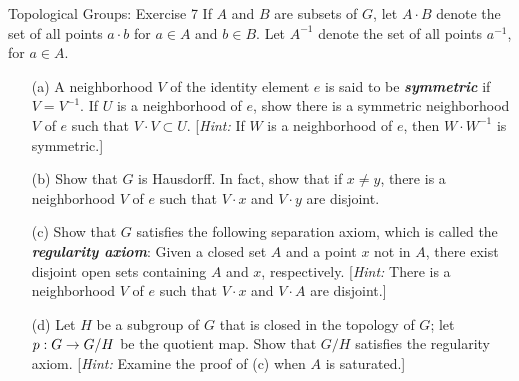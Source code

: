 \documentclass{hmwk}
\begin{document}
\begin{problem}{Topological Groups: Exercise 7}
    If $A$ and $B$ are subsets of $G$, let $A \cdot B$ denote the set of all points $a \cdot b$ for $a \in A$ and $b \in B$. Let $A^{-1}$ denote the set of all points $a^{-1}$, for $a \in A$. 
    \begin{itemize}
        \item[(a)] A neighborhood $V$ of the identity element $e$ is said to be \textbf{\textit{symmetric}} if $V = V^{-1}$. If $U$ is a neighborhood of $e$, show there is a symmetric neighborhood $V$ of $e$ such that $V \cdot V \subset U$. [\textit{Hint:} If $W$ is a neighborhood of $e$, then $W \cdot W^{-1}$ is symmetric.]
        \item[(b)] Show that $G$ is Hausdorff. In fact, show that if $x \neq y$, there is a neighborhood $V$ of $e$ such that $V \cdot x$ and $V \cdot y$ are disjoint. 
        \item[(c)] Show that $G$ satisfies the following separation axiom, which is called the \textbf{\textit{regularity axiom}}: Given a closed set $A$ and a point $x$ not in $A$, there exist disjoint open sets containing $A$ and $x$, respectively. [\textit{Hint:} There is a neighborhood $V$ of $e$ such that $V \cdot x$ and $V \cdot A$ are disjoint.]
        \item[(d)] Let $H$ be a subgroup of $G$ that is closed in the topology of $G$; let $p: G \rightarrow G/H$ be the quotient map. Show that $G/H$ satisfies the regularity axiom. [\textit{Hint: } Examine the proof of (c) when $A$ is saturated.] 
    \end{itemize}
\end{problem}
\end{document}
